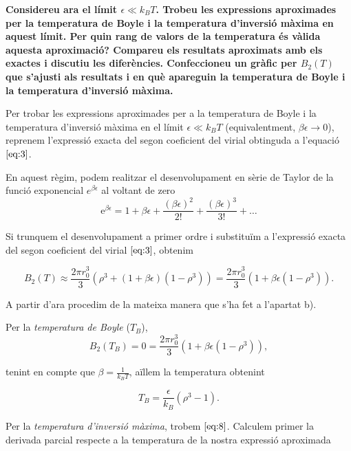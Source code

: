\documentclass[a4paper, 10pt]{article}
\begin{document}
\textbf{Considereu ara el límit $\epsilon \ll k_BT$. Trobeu les expressions aproximades per la temperatura de Boyle i la temperatura d'inversió màxima en aquest límit. Per quin rang de valors de la temperatura és vàlida aquesta aproximació? Compareu els resultats aproximats amb els exactes i discutiu les diferències. Confeccioneu un gràfic per $B_2(T)$ que s'ajusti als resultats i en què apareguin la temperatura de Boyle i la temperatura d'inversió màxima.}

Per trobar les expressions aproximades per a la temperatura de Boyle i la temperatura d'inversió màxima en el límit $\epsilon \ll k_B T$ (equivalentment, $\beta\epsilon \to 0$), reprenem l'expressió exacta del segon coeficient del virial obtinguda a l'equació $\ref{eq:3}$.

En aquest règim, podem realitzar el desenvolupament en sèrie de Taylor de la funció exponencial $e^{\beta\epsilon}$ al voltant de zero
\begin{equation*}
	\mathrm{e}^{\beta\epsilon} = 1 + \beta\epsilon + \frac{(\beta\epsilon)^2}{2!} + \frac{(\beta\epsilon)^3}{3!} + \dots
\end{equation*}

Si trunquem el desenvolupament a primer ordre i substituïm a l'expressió exacta del segon coeficient del virial $\ref{eq:3}$, obtenim

\begin{equation}
	B_2(T) \approx \frac{2\pi r_0^3}{3}\left(\rho^3 + (1 + \beta\epsilon)(1-\rho^3)\right) = \frac{2\pi r_0^3}{3}\left( 1 + \beta\epsilon(1-\rho^3)\right). 
\end{equation}

A partir d'ara procedim de la mateixa manera que s'ha fet a l'apartat b). 

Per la \textit{temperatura de Boyle} ($T_B$),
\begin{equation}
	B_2(T_B) = 0 = \frac{2\pi r_0^3}{3}\left( 1 + \beta\epsilon(1-\rho^3)\right),
\end{equation}

tenint en compte que $\beta = \frac{1}{k_B T}$, aïllem la temperatura obtenint

\begin{equation}
	\boxed{ T_B = \frac{\epsilon}{k_B} (\rho^3 - 1) }.
	\label{eq:TB} 
\end{equation}

Per la \textit{temperatura d'inversió màxima}, trobem $\ref{eq:8}$. Calculem primer la derivada parcial respecte a la temperatura de la nostra expressió aproximada
\end{document}
